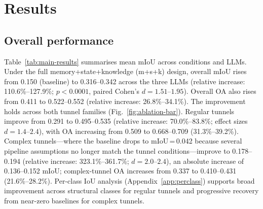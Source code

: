 \documentclass[a4paper,fleqn]{cas-dc}
\begin{document}
\section{Results}\label{sec:results}

\subsection{Overall performance}\label{sec:main-results}

Table~\ref{tab:main-results} summarises mean mIoU across conditions and LLMs. Under the full memory+state+knowledge (m+s+k) design, overall mIoU rises from 0.150 (baseline) to 0.316--0.342 across the three LLMs (relative increase: 110.6\%--127.9\%; $p < 0.0001$, paired Cohen's $d = 1.51$--$1.95$). Overall OA also rises from 0.411 to 0.522--0.552 (relative increase: 26.8\%--34.1\%). The improvement holds across both tunnel families (Fig.~\ref{fig:ablation-bar}). Regular tunnels improve from 0.291 to 0.495--0.535 (relative increase: 70.0\%--83.8\%; effect sizes $d = 1.4$--$2.4$), with OA increasing from 0.509 to 0.668--0.709 (31.3\%--39.2\%). Complex tunnels---where the baseline drops to mIoU\,=\,0.042 because several pipeline assumptions no longer match the tunnel conditions---improve to 0.178--0.194 (relative increase: 323.1\%--361.7\%; $d = 2.0$--$2.4$), an absolute increase of 0.136--0.152 mIoU; complex-tunnel OA increases from 0.337 to 0.410--0.431 (21.6\%--28.2\%). Per-class IoU analysis (Appendix~\ref{app:perclass}) supports broad improvement across structural classes for regular tunnels and progressive recovery from near-zero baselines for complex tunnels.
\end{document}
